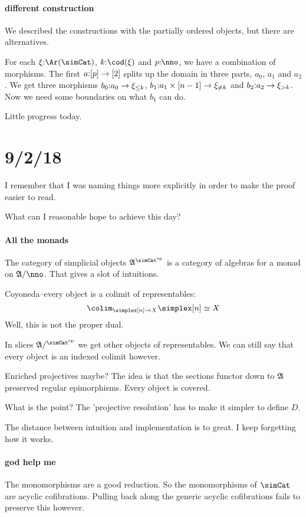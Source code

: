 \documentclass[csh.tex]{subfiles}
\begin{document}
\paragraph{different construction}
We described the constructions with the partially ordered objects, but there are alternatives.

For each $\xi\of\Ar(\simCat)$, $k\of \cod(\xi)$ and $p\of\nno$, we have a combination of morphisms. The first $a\mathord :[p]\to[2]$ splits up the domain in three parts, $a_0$, $a_1$ and $a_2$. 
We get three morphisms $b_0\mathord : a_0 \to \xi_{\leq k}$, $b_1\mathord : a_1\times[n-1]\to \xi_{\neq k}$ and $b_2\mathord : a_2\to\xi_{>k}$. Now we need some boundaries on what $b_1$ can do. 
 
Little progress today.

\section{9/2/18}
I remember that I was naming things more explicitly in order to make the proof easier to read.

What can I reasonable hope to achieve this day?




\paragraph{All the monads}
The category of simplicial objects $\ambient\s$ is a category of algebras for a monad on $\ambient/\nno$. That gives a slot of intuitions.

Coyoneda--every object is a colimit of representables:
\[
\colim_{\simplex[n] \to X} \simplex[n] \simeq X
\]
Well, this is not the proper dual.

In slices $\ambient/\s$ we get other objects of representables.
We can still say that every object is an indexed colimit however.

Enriched projectives maybe?
The idea is that the sections functor down to $\mathfrak A$ preserved regular epimorphisms. Every object is covered.

What is the point? The 'projective resolution' has to make it simpler to define $D$.

The distance between intuition and implementation is to great. I keep
forgetting how it works.

\paragraph{god help me}
The monomorphisms are a good reduction. So the monomorphisms of $\simCat$ are acyclic cofibrations. Pulling back along the generic acyclic cofibrations fails to preserve this however.
\end{document}
